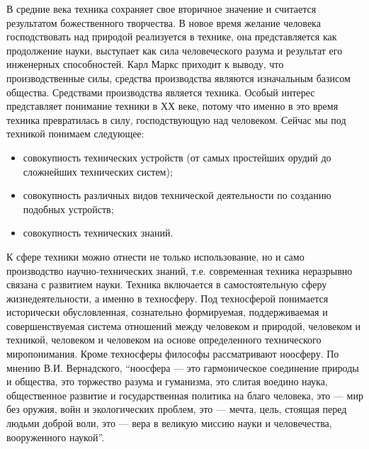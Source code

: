 В средние века техника сохраняет свое вторичное значение и считается результатом божественного творчества. В новое время желание человека господствовать над природой реализуется в технике, она представляется как продолжение науки, выступает как сила человеческого разума и результат его инженерных способностей. Карл Маркс приходит к выводу, что производственные силы, средства производства являются изначальным базисом общества. Средствами производства является техника. Особый интерес представляет понимание техники в ХХ веке, потому что именно в это время техника превратилась в силу, господствующую над человеком. Сейчас мы под техникой понимаем следующее:

\begin{itemize}
\item{совокупность технических устройств (от самых простейших орудий до сложнейших технических систем);}
\item{совокупность различных видов технической деятельности по созданию подобных устройств;}
\item{совокупность технических знаний.}
\end{itemize}

К сфере техники можно отнести не только использование, но и само производство научно-технических знаний, т.е. современная техника неразрывно связана с развитием науки. Техника включается в самостоятельную сферу жизнедеятельности, а именно в техносферу. Под техносферой понимается исторически обусловленная, сознательно формируемая, поддерживаемая и совершенствуемая система отношений между человеком и природой, человеком и техникой, человеком и человеком на основе определенного технического миропонимания. Кроме техносферы философы рассматривают ноосферу. По мнению В.И. Вернадского, ``ноосфера — это гармоническое соединение природы и общества, это торжество разума и гуманизма, это слитая воедино наука, общественное развитие и государственная политика на благо человека, это — мир без оружия, войн и экологических проблем, это — мечта, цель, стоящая перед людьми доброй воли, это — вера в великую миссию науки и человечества, вооруженного наукой''.

